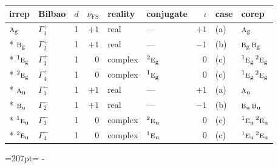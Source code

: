 \documentclass[10pt,a4paper]{article}
\newcommand{\needspace}[1]{\par\penalty-100\begingroup\dimen0=#1\relax\dimen2=\pagegoal
  \advance\dimen2-\pagetotal\ifdim\dimen0>\dimen2\relax\ifdim\dimen2>0pt\vfil\break\fi\fi
  \endgroup}
\numberwithin{equation}{section}
\newcommand{\irr}[1]{\text{\normalfont\scshape #1}}
\newcommand{\conjpair}[1]{{}^{#1}}
\newcommand{\ptag}[1]{\mathrm{#1}}
\newcommand{\fsind}{\nu_{\mathrm{FS}}}
\begin{document}
{\small\renewcommand{\arraystretch}{1.25}\setlength{\tabcolsep}{4pt}\begin{longtable}{@{}llrrllrll@{}}\toprule
irrep & Bilbao & $d$ & $\fsind$ & reality & conjugate & $\iota$ & case & corep\\\midrule\endhead
\bottomrule\endfoot\endlastfoot
$\irr{a}_{\ptag{g}}$ & $\Gamma_{1}^{+}$ & 1 & $+1$ & real & --- & $+1$ & (a) & $\irr{a}_{\ptag{g}}$\\*
$\irr{b}_{\ptag{g}}$ & $\Gamma_{2}^{+}$ & 1 & $+1$ & real & --- & $-1$ & (b) & $\irr{b}_{\ptag{g}}\,\irr{b}_{\ptag{g}}$\\*
$\conjpair{1}\irr{e}_{\ptag{g}}$ & $\Gamma_{3}^{+}$ & 1 & $0$ & complex & $\conjpair{2}\irr{e}_{\ptag{g}}$ & $0$ & (c) & $\conjpair{1}\irr{e}_{\ptag{g}}\,\conjpair{2}\irr{e}_{\ptag{g}}$\\*
$\conjpair{2}\irr{e}_{\ptag{g}}$ & $\Gamma_{4}^{+}$ & 1 & $0$ & complex & $\conjpair{1}\irr{e}_{\ptag{g}}$ & $0$ & (c) & $\conjpair{1}\irr{e}_{\ptag{g}}\,\conjpair{2}\irr{e}_{\ptag{g}}$\\*
$\irr{a}_{\ptag{u}}$ & $\Gamma_{1}^{-}$ & 1 & $+1$ & real & --- & $+1$ & (a) & $\irr{a}_{\ptag{u}}$\\*
$\irr{b}_{\ptag{u}}$ & $\Gamma_{2}^{-}$ & 1 & $+1$ & real & --- & $-1$ & (b) & $\irr{b}_{\ptag{u}}\,\irr{b}_{\ptag{u}}$\\*
$\conjpair{1}\irr{e}_{\ptag{u}}$ & $\Gamma_{3}^{-}$ & 1 & $0$ & complex & $\conjpair{2}\irr{e}_{\ptag{u}}$ & $0$ & (c) & $\conjpair{1}\irr{e}_{\ptag{u}}\,\conjpair{2}\irr{e}_{\ptag{u}}$\\*
$\conjpair{2}\irr{e}_{\ptag{u}}$ & $\Gamma_{4}^{-}$ & 1 & $0$ & complex & $\conjpair{1}\irr{e}_{\ptag{u}}$ & $0$ & (c) & $\conjpair{1}\irr{e}_{\ptag{u}}\,\conjpair{2}\irr{e}_{\ptag{u}}$\\
\bottomrule\end{longtable}}
\needspace{207pt}
\end{document}
